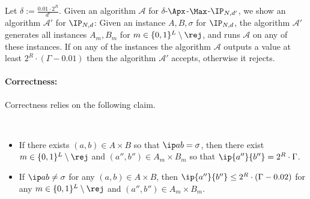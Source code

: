 \documentclass[11pt]{article}
\begin{document}
Let $\delta:= \frac {0.01 \cdot 2^R } {d'}$.
Given an algorithm $\mathcal A$ for $\delta$-$\Apx$-$\Max$-$\IP_{N,d'}$, we show an algorithm $\mathcal {A'}$ for $\IP_{N,d}$:
Given an instance $A,B, \sigma$ for $\IP_{N,d}$, the algorithm $\mathcal {A'}$
generates all instances $A_m,B_m$ for $m \in \{0,1\}^L \setminus \rej$, and
runs $\mathcal A$ on any of these instances. 
If on any of the instances the algorithm $\mathcal A$ outputs a value at least $2^R \cdot (\Gamma - 0.01)$ then the algorithm $\mathcal {A'}$ accepts, otherwise it rejects.

\paragraph{Correctness: }

Correctness relies on the following claim.

\begin{claim}
$\;$
\begin{itemize}
\item If there exists $(a,b) \in A \times B$ so that $\ip a b =\sigma$, then there exist $m \in \{0,1\}^L \setminus \rej$ and  $(a'',b'') \in A_m \times B_m$ so that $\ip {a''} {b''} = 2^R \cdot \Gamma$.
\item If   $\ip a b \neq \sigma$ for any $(a,b) \in A\times B$, then $\ip {a''} {b''} \leq  2^R \cdot (\Gamma -0.02)$ for any $m \in \{0,1\}^L \setminus \rej$ and $(a'',b'') \in A_m \times B_m$.
\end{itemize}
\end{claim}
\end{document}
